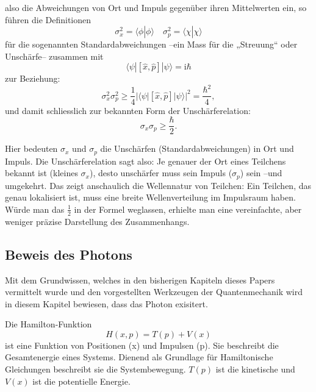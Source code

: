 also die Abweichungen von Ort und Impuls gegenüber ihren Mittelwerten ein, so führen die Definitionen
\begin{equation}
	\sigma_x^2 = \langle\phi | \phi\rangle \quad \sigma_p^2 = \langle\chi | \chi\rangle
\end{equation}
für die sogenannten Standardabweichungen --ein Mass für die „Streuung“ oder Unschärfe-- zusammen mit
\begin{equation}
	\langle\psi | [\hat{x},\hat{p}] | \psi\rangle = \mathrm{i}\hbar
\end{equation}
zur Beziehung:
\begin{equation}
	\sigma_x^2 \sigma_p^2 \ge \frac{1}{4} |\langle\psi | [\hat{x},\hat{p}] | \psi\rangle|^2 = \frac{\hbar^2}{4},
\end{equation}
und damit schliesslich zur bekannten Form der Unschärferelation:
\begin{equation}
	\sigma_x \sigma_p \ge \frac{\hbar}{2}.
\end{equation}

Hier bedeuten $\sigma_x$ und $\sigma_p$ die Unschärfen (Standardabweichungen) in Ort und Impuls.
Die Unschärferelation sagt also:
Je genauer der Ort eines Teilchens bekannt ist (kleines $\sigma_x$), desto unschärfer muss sein Impuls ($\sigma_p$) sein --und umgekehrt.
Das zeigt anschaulich die Wellennatur von Teilchen:
Ein Teilchen, das genau lokalisiert ist, muss eine breite Wellenverteilung im Impulsraum haben.
Würde man das $\tfrac{1}{2}$ in der Formel weglassen, erhielte man eine vereinfachte, aber weniger präzise Darstellung des Zusammenhangs.

\subsection{Beweis des Photons\label{fourier:subsection:beweisPhoton}}
Mit dem Grundwissen, welches in den bisherigen Kapiteln dieses Papers vermittelt wurde und den vorgestellten Werkzeugen der Quantenmechanik wird in diesem Kapitel bewiesen, dass das Photon exisitert.

Die Hamilton-Funktion
\begin{equation}
	H(x,p) = T(p) + V(x)
\end{equation}
ist eine Funktion von Positionen (x) und Impulsen (p).
Sie beschreibt die Gesamtenergie eines Systems.
Dienend als Grundlage für Hamiltonische Gleichungen beschreibt sie die Systembewegung.
$T(p)$ ist die kinetische und $V(x)$ ist die potentielle Energie.


